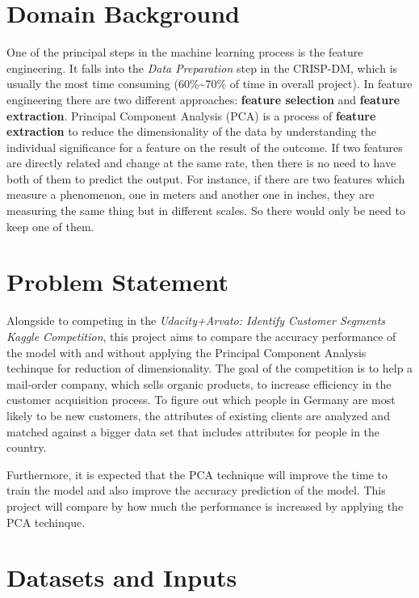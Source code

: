 \hypertarget{domain-background}{%
\section{Domain Background}\label{domain-background}}

One of the principal steps in the machine learning process is the
feature engineering. It falls into the \emph{Data Preparation} step in
the CRISP-DM, which is usually the most time consuming
(60\%\textasciitilde70\% of time in overall project). In feature
engineering there are two different approaches: \textbf{feature
selection} and \textbf{feature extraction}. Principal Component Analysis
(PCA) is a process of \textbf{feature extraction} to reduce the
dimensionality of the data by understanding the individual significance
for a feature on the result of the outcome. If two features are directly
related and change at the same rate, then there is no need to have both
of them to predict the output. For instance, if there are two features
which measure a phenomenon, one in meters and another one in inches,
they are measuring the same thing but in different scales. So there
would only be need to keep one of them.

\hypertarget{problem-statement}{%
\section{Problem Statement}\label{problem-statement}}

Alongside to competing in the \emph{Udacity+Arvato: Identify Customer
Segments Kaggle Competition}\cite{arvato_kaggle_competition}, this
project aims to compare the accuracy performance of the model with and
without applying the Principal Component Analysis techinque for
reduction of dimensionality. The goal of the competition is to help a
mail-order company, which sells organic products, to increase efficiency
in the customer acquisition process. To figure out which people in
Germany are most likely to be new customers, the attributes of existing
clients are analyzed and matched against a bigger data set that includes
attributes for people in the country.

Furthermore, it is expected that the PCA technique will improve the time
to train the model and also improve the accuracy prediction of the
model. This project will compare by how much the performance is
increased by applying the PCA techinque.

\hypertarget{datasets-and-inputs}{%
\section{Datasets and Inputs}\label{datasets-and-inputs}}

